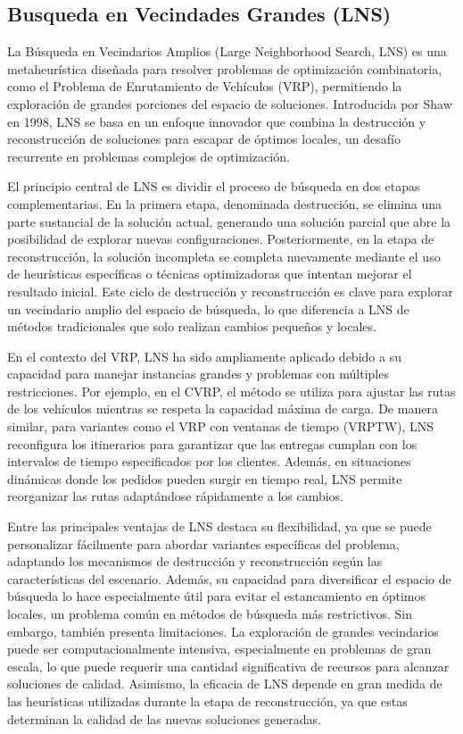 \documentclass{article}
\begin{document}
\subsection{Busqueda en Vecindades Grandes (LNS)}
La Búsqueda en Vecindarios Amplios (Large Neighborhood Search, LNS) es una metaheurística diseñada para resolver problemas de optimización combinatoria, como el Problema de Enrutamiento de Vehículos (VRP), permitiendo la exploración de grandes porciones del espacio de soluciones. Introducida por Shaw en 1998, LNS se basa en un enfoque innovador que combina la destrucción y reconstrucción de soluciones para escapar de óptimos locales, un desafío recurrente en problemas complejos de optimización.

El principio central de LNS es dividir el proceso de búsqueda en dos etapas complementarias. En la primera etapa, denominada destrucción, se elimina una parte sustancial de la solución actual, generando una solución parcial que abre la posibilidad de explorar nuevas configuraciones. Posteriormente, en la etapa de reconstrucción, la solución incompleta se completa nuevamente mediante el uso de heurísticas específicas o técnicas optimizadoras que intentan mejorar el resultado inicial. Este ciclo de destrucción y reconstrucción es clave para explorar un vecindario amplio del espacio de búsqueda, lo que diferencia a LNS de métodos tradicionales que solo realizan cambios pequeños y locales.

En el contexto del VRP, LNS ha sido ampliamente aplicado debido a su capacidad para manejar instancias grandes y problemas con múltiples restricciones. Por ejemplo, en el CVRP, el método se utiliza para ajustar las rutas de los vehículos mientras se respeta la capacidad máxima de carga. De manera similar, para variantes como el VRP con ventanas de tiempo (VRPTW), LNS reconfigura los itinerarios para garantizar que las entregas cumplan con los intervalos de tiempo especificados por los clientes. Además, en situaciones dinámicas donde los pedidos pueden surgir en tiempo real, LNS permite reorganizar las rutas adaptándose rápidamente a los cambios.

Entre las principales ventajas de LNS destaca su flexibilidad, ya que se puede personalizar fácilmente para abordar variantes específicas del problema, adaptando los mecanismos de destrucción y reconstrucción según las características del escenario. Además, su capacidad para diversificar el espacio de búsqueda lo hace especialmente útil para evitar el estancamiento en óptimos locales, un problema común en métodos de búsqueda más restrictivos. Sin embargo, también presenta limitaciones. La exploración de grandes vecindarios puede ser computacionalmente intensiva, especialmente en problemas de gran escala, lo que puede requerir una cantidad significativa de recursos para alcanzar soluciones de calidad. Asimismo, la eficacia de LNS depende en gran medida de las heurísticas utilizadas durante la etapa de reconstrucción, ya que estas determinan la calidad de las nuevas soluciones generadas.\cite{ref4}
\end{document}
